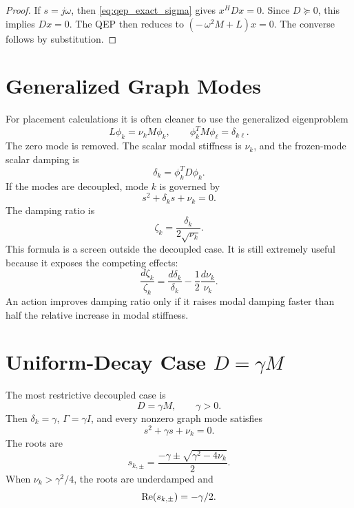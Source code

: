 \begin{proof}
If \(s=j\omega\), then \eqref{eq:qep_exact_sigma} gives \(x^HDx=0\). Since
\(D\succeq0\), this implies \(Dx=0\). The QEP then reduces to
\((-\,\omega^2M+L)x=0\). The converse follows by substitution.
\end{proof}

\section{Generalized Graph Modes}

For placement calculations it is often cleaner to use the generalized
eigenproblem
\begin{equation}
  L\phi_k=\nu_k M\phi_k,\qquad
  \phi_k^T M\phi_\ell=\delta_{k\ell}.
  \label{eq:generalized_modes}
\end{equation}
The zero mode is removed. The scalar modal stiffness is \(\nu_k\), and the
frozen-mode scalar damping is
\begin{equation}
  \delta_k=\phi_k^TD\phi_k.
  \label{eq:modal_delta_physical}
\end{equation}
If the modes are decoupled, mode \(k\) is governed by
\begin{equation}
  s^2+\delta_k s+\nu_k=0.
  \label{eq:fixed_scalar_generalized}
\end{equation}
The damping ratio is
\begin{equation}
  \zeta_k=\frac{\delta_k}{2\sqrt{\nu_k}}.
  \label{eq:fixed_zeta_generalized}
\end{equation}
This formula is a screen outside the decoupled case. It is still extremely
useful because it exposes the competing effects:
\begin{equation}
  \frac{d\zeta_k}{\zeta_k}
  =
  \frac{d\delta_k}{\delta_k}
  -
  \frac{1}{2}\frac{d\nu_k}{\nu_k}.
  \label{eq:zeta_log_differential}
\end{equation}
An action improves damping ratio only if it raises modal damping faster than
half the relative increase in modal stiffness.

\section{Uniform-Decay Case \texorpdfstring{\(D=\gamma M\)}{D=gamma M}}

The most restrictive decoupled case is
\begin{equation}
  D=\gamma M,\qquad \gamma>0.
  \label{eq:proportional_damping}
\end{equation}
Then \(\delta_k=\gamma\), \(\Gamma=\gamma I\), and every nonzero graph mode
satisfies
\begin{equation}
  s^2+\gamma s+\nu_k=0.
  \label{eq:fixed_scalar_mode}
\end{equation}
The roots are
\begin{equation}
  s_{k,\pm}=\frac{-\gamma\pm\sqrt{\gamma^2-4\nu_k}}{2}.
  \label{eq:fixed_proportional_roots}
\end{equation}
When \(\nu_k>\gamma^2/4\), the roots are underdamped and
\begin{equation}
  \operatorname{Re}(s_{k,\pm})=-\gamma/2.
  \label{eq:fixed_decay_floor}
\end{equation}


